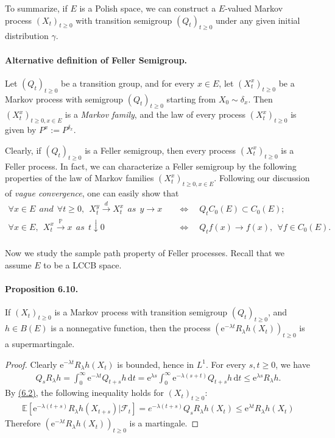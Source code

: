 \documentclass{article}
\numberwithin{equation}{section}
\newcommand{\e}{\mathrm{e}}
\newcommand{\E}{\mathbb{E}}
\renewcommand{\P}{\mathbb{P}}
\renewcommand{\d}{\mathrm{d}}
\theoremstyle{plain}
\theoremstyle{definition}
\begin{document}
To summarize, if $E$ is a Polish space, we can construct a $E$-valued Markov process $(X_t)_{t\geq 0}$ with transition semigroup $(Q_t)_{t\geq 0}$ under any given initial distribution $\gamma$.

\paragraph{Alternative definition of Feller Semigroup.} Let $(Q_t)_{t\geq 0}$ be a transition group, and for every $x\in E$, let $(X_t^x)_{t\geq 0}$ be a Markov process with semigroup $(Q_t)_{t\geq 0}$ starting from $X_0\sim\delta_x$. Then $(X_t^x)_{t\geq 0,x\in E}$ is a \textit{Markov family}, and the law of every process $(X_t^x)_{t\geq 0}$ is given by $P^x:=P^{\delta_x}$.

Clearly, if $(Q_t)_{t\geq 0}$ is a Feller semigroup, then every process $(X_t^x)_{t\geq 0}$ is a Feller process. In fact, we can characterize a Feller semigroup by the following properties of the law of Markov families $(X_t^x)_{t\geq 0,x\in E}$. Following our discussion of \textit{vague convergence}, one can easily show that
\begin{align*}
\forall x\in E\ \ and\ \ \forall t\geq 0,\ \ X_t^y\overset{d}{\to}X_t^x\ \ as\ \ y\to x\quad&\Leftrightarrow\quad Q_tC_0(E)\subset C_0(E);\\
\forall x\in E,\ \ X_t^x\overset{\P}{\to} x\ \ as\ \ t\downarrow 0\quad&\Leftrightarrow\quad Q_tf(x)\to f(x),\ \ \forall f\in C_0(E).
\end{align*}

\paragraph{} Now we study the sample path property of Feller processes. Recall that we assume $E$ to be a LCCB space.

\paragraph{Proposition 6.10.\label{prop:6.10}} If $(X_t)_{t\geq 0}$ is a Markov process with transition semigroup $(Q_t)_{t\geq 0}$, and $h\in B(E)$ is a nonnegative function, then the process $(\e^{-\lambda t}R_\lambda h(X_t))_{t\geq 0}$ is a supermartingale.
\begin{proof}
	Clearly $\e^{-\lambda t}R_\lambda h(X_t)$ is bounded, hence in $L^1$. For every $s,t\geq 0$, we have
	\begin{align*}
		Q_sR_\lambda h = \int_0^\infty\e^{-\lambda t}Q_{t+s}h\,\d t = \e^{\lambda s}\int_0^\infty\e^{-\lambda(s+t)}Q_{t+s}h\,\d t\leq \e^{\lambda s}R_\lambda h.
	\end{align*}
	By \hyperref[eq:6.2]{(6.2)}, the following inequality holds for $(X_t)_{t\geq 0}$:
	\begin{align*}
		\E[\e^{-\lambda(t+s)}R_\lambda h(X_{t+s})|\mathscr{F}_t]=e^{-\lambda(t+s)}Q_sR_\lambda h(X_t)\leq \e^{\lambda t} R_\lambda h(X_t)
	\end{align*}
	Therefore $(\e^{-\lambda t}R_\lambda h(X_t))_{t\geq 0}$ is a martingale.
\end{proof}
\end{document}
